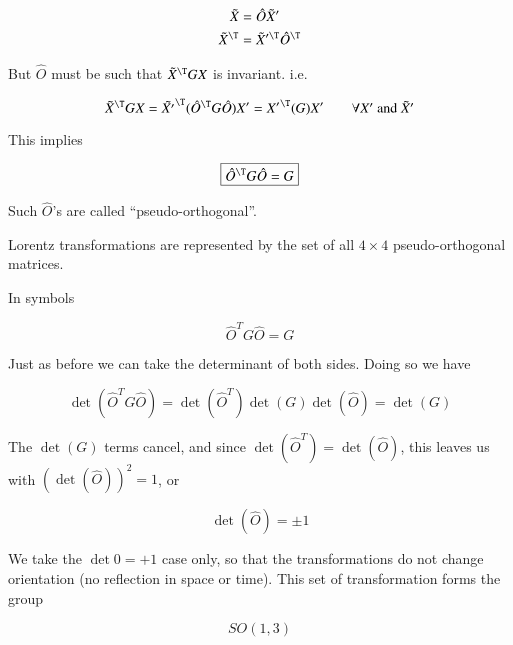 \begin{align}\label{eqn:relativisticElectrodynamicsL6:90}
\tilde{X} &= \hat{O} \tilde{X}' \\
\tilde{X}^\T &= \tilde{X}'^\T \hat{O}^\T
\end{align}

But $\hat{O}$ must be such that $\tilde{X}^\T G X$ is invariant.  i.e.

\begin{equation}\label{eqn:relativisticElectrodynamicsL6:100}
\tilde{X}^\T G X = {\tilde{X'}}^\T (\hat{O}^\T G \hat{O}) X' = {X'}^\T (G) X' \qquad \mbox{$\forall X'$ and $\tilde{X}'$}
\end{equation}

This implies

\begin{equation}\label{eqn:relativisticElectrodynamicsL6:110}
\boxed{\hat{O}^\T G \hat{O} = G}
\end{equation}

Such $\hat{O}$'s are called ``pseudo-orthogonal''.

Lorentz transformations are represented by the set of all $4 \times 4$ pseudo-orthogonal matrices.

In symbols

\begin{equation}\label{eqn:relativisticElectrodynamicsL6:120}
\hat{O}^T G \hat{O} = G
\end{equation}

Just as before we can take the determinant of both sides.  Doing so we have

\begin{equation}\label{eqn:relativisticElectrodynamicsL6:130}
\det(\hat{O}^T G \hat{O}) = \det(\hat{O}^T) \det(G) \det(\hat{O}) = \det(G)
\end{equation}

The $\det(G)$ terms cancel, and since $\det(\hat{O}^T) = \det(\hat{O})$, this leaves us with $(\det(\hat{O}))^2 = 1$, or

\begin{equation}\label{eqn:relativisticElectrodynamicsL6:140}
\det(\hat{O}) = \pm 1
\end{equation}

We take the $\det 0 = +1$ case only, so that the transformations do not change orientation (no reflection in space or time).  This set of transformation forms the group

\begin{equation*}
SO(1,3)
\end{equation*}

